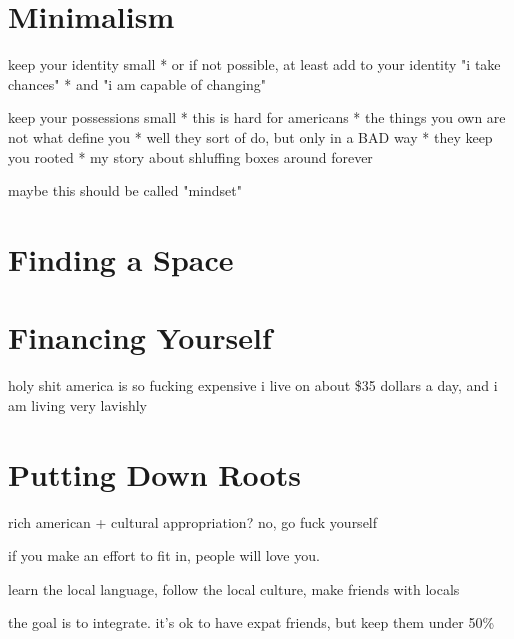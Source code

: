 \documentclass[]{book}
\begin{document}
\chapter{Minimalism}

keep your identity small
* or if not possible, at least add to your identity "i take chances"
* and "i am capable of changing"

keep your possessions small
* this is hard for americans
* the things you own are not what define you
  * well they sort of do, but only in a BAD way
  * they keep you rooted
* my story about shluffing boxes around forever

maybe this should be called "mindset"


\chapter{Finding a Space}

\chapter{Financing Yourself}

holy shit america is so fucking expensive
i live on about \$35 dollars a day, and i am living very lavishly


\chapter{Putting Down Roots}

rich american + cultural appropriation? no, go fuck yourself

if you make an effort to fit in, people will love you.

learn the local language, follow the local culture, make friends with locals

the goal is to integrate. it's ok to have expat friends, but keep them under 50\%
\end{document}
